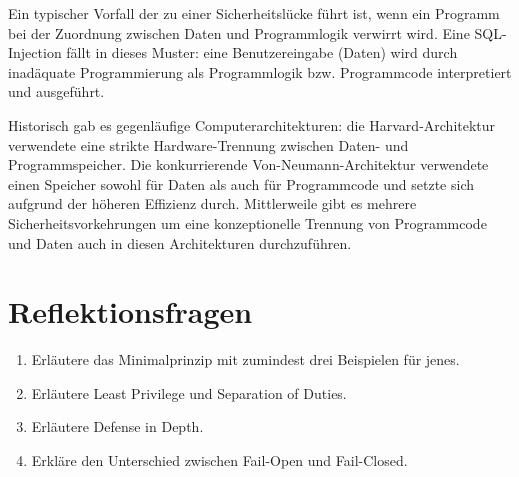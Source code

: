 Ein typischer Vorfall der zu einer Sicherheitslücke führt ist, wenn ein Programm bei der Zuordnung zwischen Daten und Programmlogik verwirrt wird. Eine SQL-Injection fällt in dieses Muster: eine Benutzereingabe (Daten) wird durch inadäquate Programmierung als Programmlogik bzw. Programmcode interpretiert und ausgeführt.

Historisch gab es gegenläufige Computerarchitekturen: die Harvard-Architektur verwendete eine strikte Hardware-Trennung zwischen Daten- und Programmspeicher. Die konkurrierende Von-Neumann-Architektur verwendete einen Speicher sowohl für Daten als auch für Programmcode und setzte sich aufgrund der höheren Effizienz durch. Mittlerweile gibt es mehrere Sicherheitsvorkehrungen um eine konzeptionelle Trennung von Programmcode und Daten auch in diesen Architekturen durchzuführen.

\section{Reflektionsfragen}

\begin{enumerate}
	\item Erläutere das Minimalprinzip mit zumindest drei Beispielen für jenes.
	\item Erläutere Least Privilege und Separation of Duties.
	\item Erläutere Defense in Depth.
	\item Erkläre den Unterschied zwischen Fail-Open und Fail-Closed.
\end{enumerate}
